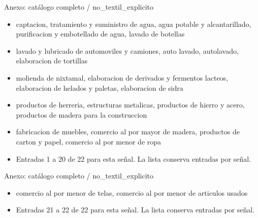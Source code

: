 \documentclass[aspectratio=169,10pt]{beamer}
\begin{document}
\begin{frame}{Anexo: catálogo completo / no\_textil\_explicito}
\small
\begin{itemize}
\item captacion, tratamiento y suministro de agua, agua potable y alcantarillado, purificacion y embotellado de agua, lavado de botellas
\item lavado y lubricado de automoviles y camiones, auto lavado, autolavado, elaboracion de tortillas
\item molienda de nixtamal, elaboracion de derivados y fermentos lacteos, elaboracion de helados y paletas, elaboracion de sidra
\item productos de herreria, estructuras metalicas, productos de hierro y acero, productos de madera para la construccion
\item fabricacion de muebles, comercio al por mayor de madera, productos de carton y papel, comercio al por menor de ropa
\item Entradas 1 a 20 de 22 para esta señal. La lista conserva entradas por señal.
\end{itemize}
\end{frame}
\begin{frame}{Anexo: catálogo completo / no\_textil\_explicito}
\small
\begin{itemize}
\item comercio al por menor de telas, comercio al por menor de articulos usados
\item Entradas 21 a 22 de 22 para esta señal. La lista conserva entradas por señal.
\end{itemize}
\end{frame}
\end{document}
